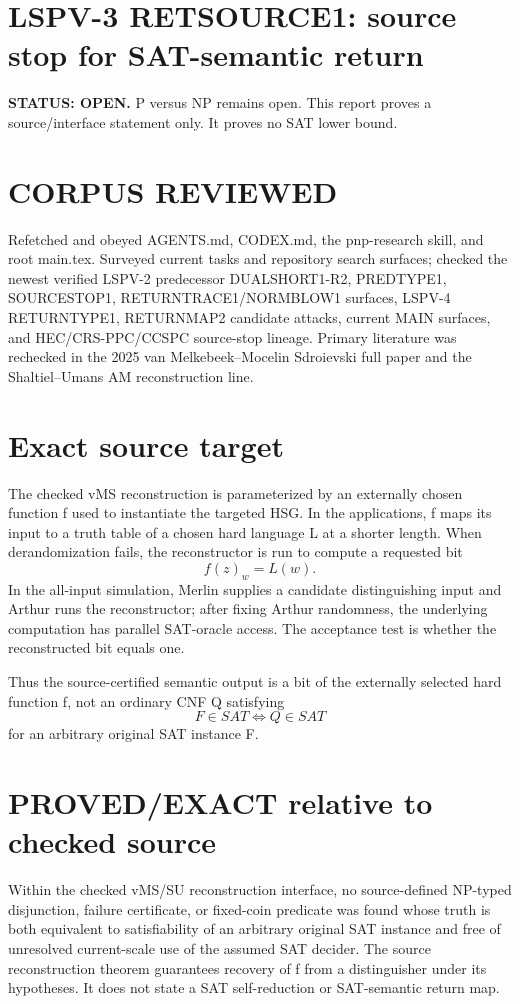 \documentclass[11pt]{article}
\begin{document}
\section*{LSPV-3 RETSOURCE1: source stop for SAT-semantic return}
\textbf{STATUS: OPEN.} P versus NP remains open. This report proves a source/interface statement only. It proves no SAT lower bound.

\section*{CORPUS REVIEWED}
Refetched and obeyed AGENTS.md, CODEX.md, the pnp-research skill, and root main.tex. Surveyed current tasks and repository search surfaces; checked the newest verified LSPV-2 predecessor DUALSHORT1-R2, PREDTYPE1, SOURCESTOP1, RETURNTRACE1/NORMBLOW1 surfaces, LSPV-4 RETURNTYPE1, RETURNMAP2 candidate attacks, current MAIN surfaces, and HEC/CRS-PPC/CCSPC source-stop lineage. Primary literature was rechecked in the 2025 van Melkebeek--Mocelin Sdroievski full paper and the Shaltiel--Umans AM reconstruction line.

\section*{Exact source target}
The checked vMS reconstruction is parameterized by an externally chosen function f used to instantiate the targeted HSG. In the applications, f maps its input to a truth table of a chosen hard language L at a shorter length. When derandomization fails, the reconstructor is run to compute a requested bit
\[
f(z)_w=L(w).
\]
In the all-input simulation, Merlin supplies a candidate distinguishing input and Arthur runs the reconstructor; after fixing Arthur randomness, the underlying computation has parallel SAT-oracle access. The acceptance test is whether the reconstructed bit equals one.

Thus the source-certified semantic output is a bit of the externally selected hard function f, not an ordinary CNF Q satisfying
\[
F\in SAT\iff Q\in SAT
\]
for an arbitrary original SAT instance F.

\section*{PROVED/EXACT relative to checked source}
Within the checked vMS/SU reconstruction interface, no source-defined NP-typed disjunction, failure certificate, or fixed-coin predicate was found whose truth is both equivalent to satisfiability of an arbitrary original SAT instance and free of unresolved current-scale use of the assumed SAT decider. The source reconstruction theorem guarantees recovery of f from a distinguisher under its hypotheses. It does not state a SAT self-reduction or SAT-semantic return map.
\end{document}
